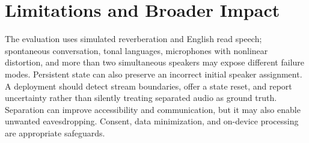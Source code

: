 \section{Limitations and Broader Impact}

The evaluation uses simulated reverberation and English read speech; spontaneous
conversation, tonal languages, microphones with nonlinear distortion, and more
than two simultaneous speakers may expose different failure modes.  Persistent
state can also preserve an incorrect initial speaker assignment.  A deployment
should detect stream boundaries, offer a state reset, and report uncertainty
rather than silently treating separated audio as ground truth.  Separation can
improve accessibility and communication, but it may also enable unwanted
eavesdropping.  Consent, data minimization, and on-device processing are
appropriate safeguards.
